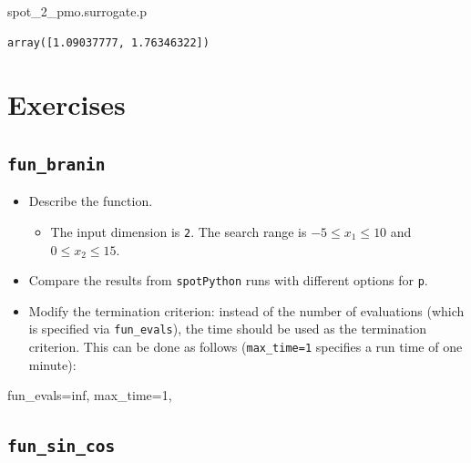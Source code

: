 \documentclass[
  letterpaper,
  DIV=11,
  numbers=noendperiod]{scrreprt}
\newenvironment{Shaded}{\begin{snugshade}}{\end{snugshade}}
\newcommand{\DecValTok}[1]{\textcolor[rgb]{0.68,0.00,0.00}{#1}}
\newcommand{\NormalTok}[1]{\textcolor[rgb]{0.00,0.23,0.31}{#1}}
\newcommand{\OperatorTok}[1]{\textcolor[rgb]{0.37,0.37,0.37}{#1}}
\providecommand{\tightlist}{%
  \setlength{\itemsep}{0pt}\setlength{\parskip}{0pt}}\usepackage{longtable,booktabs,array}
\begin{document}
\begin{Shaded}
\begin{Highlighting}[]
\NormalTok{spot\_2\_pmo.surrogate.p}
\end{Highlighting}
\end{Shaded}

\begin{verbatim}
array([1.09037777, 1.76346322])
\end{verbatim}

\section{Exercises}\label{exercises-8}

\subsection{\texorpdfstring{\texttt{fun\_branin}}{fun\_branin}}\label{fun_branin}

\begin{itemize}
\tightlist
\item
  Describe the function.

  \begin{itemize}
  \tightlist
  \item
    The input dimension is \texttt{2}. The search range is
    \(-5 \leq x_1 \leq 10\) and \(0 \leq x_2 \leq 15\).
  \end{itemize}
\item
  Compare the results from \texttt{spotPython} runs with different
  options for \texttt{p}.
\item
  Modify the termination criterion: instead of the number of evaluations
  (which is specified via \texttt{fun\_evals}), the time should be used
  as the termination criterion. This can be done as follows
  (\texttt{max\_time=1} specifies a run time of one minute):
\end{itemize}

\begin{Shaded}
\begin{Highlighting}[]
\NormalTok{fun\_evals}\OperatorTok{=}\NormalTok{inf,}
\NormalTok{max\_time}\OperatorTok{=}\DecValTok{1}\NormalTok{,}
\end{Highlighting}
\end{Shaded}

\subsection{\texorpdfstring{\texttt{fun\_sin\_cos}}{fun\_sin\_cos}}\label{fun_sin_cos}
\end{document}
